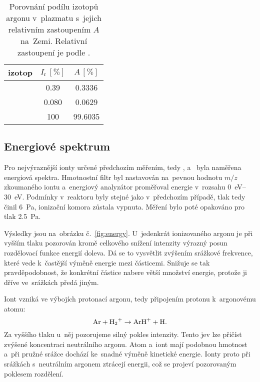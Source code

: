 \documentclass{protokol}
\newcommand\mz{m/z}
\newcommand\intens{I}
\newcommand\intensrel{\intens_\mathrm{r}}
\newcommand\abundance{A}
\begin{document}
\begin{table}
	\centering
	\caption{Porovnání podílu izotopů argonu v~plazmatu
		s~jejich relativním zastoupením $\abundance$ na~Zemi.
		Relativní zastoupení je podle \parencite{nist-ar}.}
	\label{tab:plasma-isotopes}
	\begin{tabular}{l S[table-format=3.3] S[table-format=2.4]}
		\toprule
		izotop & ${\intensrel\,[\si\percent]}$ &
			${\abundance\,[\si\percent]}$ \\
		\midrule
		 & 0.39  &  0.3336 \\
		 & 0.080 &  0.0629 \\
		 & 100   & 99.6035 \\
		\bottomrule
	\end{tabular}
\end{table}

\subsection{Energiové spektrum}
\label{sec:energy}
Pro nejvýraznější ionty určené předchozím měřením,
tedy ,  a~ byla naměřena energiová spektra.
Hmotnostní filtr byl nastavován na~pevnou hodnotu $\mz$ zkoumaného iontu
a~energiový analyzátor proměřoval energie v~rozsahu
\SIrange{0}{30}{\electronvolt}.
Podmínky v~reaktoru byly stejné jako v~předchozím případě,
tlak tedy činil \SI{6}{\pascal}, ionizační komora zůstala vypnuta.
Měření bylo poté opakováno pro tlak \SI{2.5}{\pascal}.

Výsledky jsou na~obrázku č.~\ref{fig:energy}.
U~jedenkrát ionizovaného argonu je při vyšším tlaku pozorován kromě
celkového snížení intenzity výrazný posun rozdělovací funkce energií doleva.
Dá se to vysvětlit zvýšením srážkové frekvence, které vede k~častější
výměně energie mezi částicemi.
Snižuje se tak pravděpodobnost, že konkrétní částice nabere větší
množství energie, protože ji dříve ve~srážkách předá jiným.

Iont  vzniká ve výbojích protonací argonu, tedy připojením
protonu k~argonovému atomu:
\begin{equation}
	\label{eq:arh}
	\ce{Ar} + \ce{H2+} \rightarrow \ce{ArH+} + \ce{H}.
\end{equation}
Za vyššího tlaku u~něj pozorujeme silný pokles intenzity.
Tento jev lze přičíst zvýšené koncentraci neutrálního argonu.
Atom  a~iont  mají podobnou hmotnost a~při pružné srážce
dochází ke~snadné výměně kinetické energie.
Ionty proto při srážkách s~neutrálním argonem ztrácejí energii,
což se projeví pozorovaným poklesem rozdělení.
\end{document}
